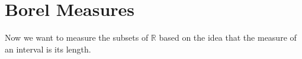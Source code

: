 \section{Borel Measures} \label{sec:}
\begin{motivation}
    Now we want to measure the subsets of $\mathbb{R}$ based on the idea that the measure of an interval is its length.
\end{motivation}




